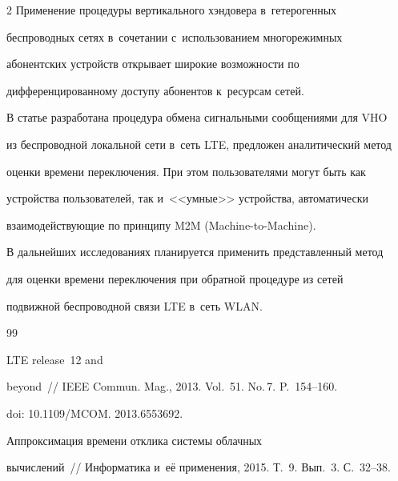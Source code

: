 \begin{multicols}{2}
  Применение процедуры вертикального хэндовера в~гетерогенных 


беспроводных сетях в~сочетании с~использованием многорежимных 


абонентских устройств открывает широкие возможности по 


дифференцированному доступу абонентов к~ресурсам сетей. 


  


  В статье разработана процедура обмена сигнальными сообщениями для VHO 


из беспроводной локальной сети в~сеть LTE, предложен аналитический метод 


оценки времени переключения. При этом пользователями могут быть как 


устройства пользователей, так и~<<умные>> устройства, автоматически 


взаимодействующие по принципу M2M (Machine-to-Machine). 


  


  В дальнейших исследованиях планируется применить представленный метод 


для оценки времени переключения при обратной процедуре из сетей 


подвижной беспроводной связи LTE в~сеть WLAN.


  


{\small\frenchspacing


 {%




 \begin{thebibliography}{99}




 LTE release~12 and 


beyond~// IEEE Commun. Mag., 2013. Vol.~51. No.\,7. P.~154--160.


doi: 10.1109/MCOM. 2013.6553692. 




 Аппроксимация времени отклика системы облачных 


вычислений~// Информатика и~её применения, 2015. Т.~9. Вып.~3. С.~32--38.



\end{thebibliography}}}
\end{multicols}
